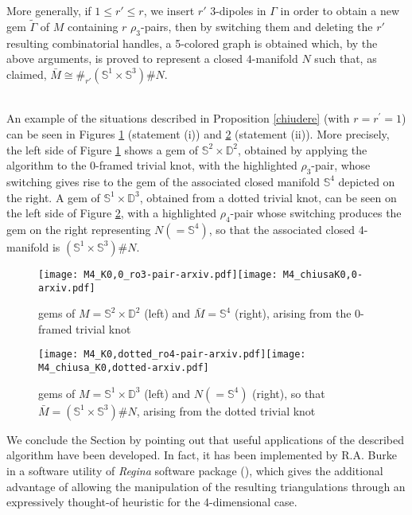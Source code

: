 \documentclass[12pt,a4paper]{article}
\newcommand{\qed}{\\ \rightline{$\Box$ \ \ \ \ \ \ \ \ \ \ \ \ \ \ \ }\\}
\newcommand{\G}{\Gamma}
\begin{document}
More generally, if $1\leq r' \le r$, we insert $r'$ 3-dipoles in $\G$ in order to obtain a new gem $\tilde\G$ of $M$ containing $r$ $\rho_3$-pairs, then by switching them and deleting the $r'$ resulting combinatorial handles, a 5-colored graph is obtained which, by the above arguments, is proved to represent a closed $4$-manifold $N$ such that, as claimed, $\bar M\cong\#_{r'}(\mathbb S^1\times\mathbb S^3)\# N.$\ \qed


\bigskip

An example of the situations described in Proposition \ref{chiudere} (with $r=r^\prime=1$) can be seen in Figures \ref{fig:M4(K0,0)} (statement (i)) and \ref{fig:M4(K0,dotted)} (statement (ii)).
More precisely, the left side of Figure \ref{fig:M4(K0,0)} shows a gem of $\mathbb S^2 \times \mathbb D^2$, obtained by applying the algorithm to the 0-framed trivial knot, with the highlighted $\rho_3$-pair, whose switching gives rise to the gem of the associated closed manifold $\mathbb S^4$ depicted on the right. 
A gem of $\mathbb S^1\times\mathbb D^3$, obtained from a dotted trivial knot, can be seen on the left side of Figure \ref{fig:M4(K0,dotted)}, with a highlighted $\rho_4$-pair whose switching produces the gem on the right representing $N (=\mathbb S^4)$, so that the associated closed 4-manifold is $(\mathbb S^1\times\mathbb S^3)\# N$.  

\begin{figure} [h!]
    \centering
    \texttt{[image: M4\_K0,0\_ro3-pair-arxiv.pdf]}\quad\texttt{[image: M4\_chiusaK0,0-arxiv.pdf]}
\caption{gems of $M = \mathbb S^2 \times \mathbb D^2$ (left) and $\bar M = \mathbb S^4$ (right), arising from the $0$-framed trivial knot} 
  \label{fig:M4(K0,0)}
\end{figure}

\begin{figure} [h!]
    \centering
    \texttt{[image: M4\_K0,dotted\_ro4-pair-arxiv.pdf]}\quad \texttt{[image: M4\_chiusa\_K0,dotted-arxiv.pdf]}
\caption{gems of $M= \mathbb S^1 \times \mathbb D^3$ (left) and  $N(=\mathbb S^4)$ (right), so that  $\bar M = (\mathbb S^1 \times \mathbb S^3) \# N$, arising from the dotted trivial knot}
    \label{fig:M4(K0,dotted)}
\end{figure}


\bigskip


We conclude the Section by pointing out that useful applications of the described algorithm have been developed.     
In fact, it has been implemented by R.A. Burke in a software utility of {\it Regina} software package (\cite{regina}), which gives the additional advantage of allowing the manipulation of the resulting triangulations through an expressively thought-of heuristic for the 4-dimensional case.
\end{document}
